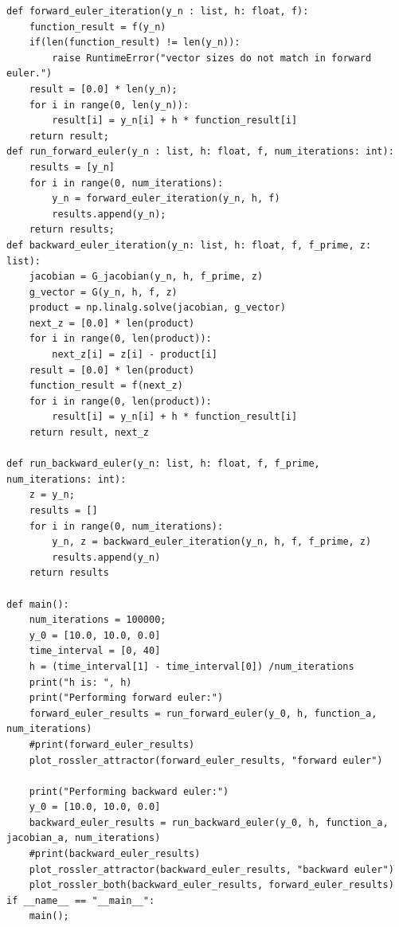 \documentclass{article}
\begin{document}
\begin{lstlisting}
def forward_euler_iteration(y_n : list, h: float, f):
    function_result = f(y_n)
    if(len(function_result) != len(y_n)):
        raise RuntimeError("vector sizes do not match in forward euler.")
    result = [0.0] * len(y_n);
    for i in range(0, len(y_n)):
        result[i] = y_n[i] + h * function_result[i]
    return result;
def run_forward_euler(y_n : list, h: float, f, num_iterations: int):
    results = [y_n]
    for i in range(0, num_iterations):
        y_n = forward_euler_iteration(y_n, h, f)
        results.append(y_n);
    return results;
def backward_euler_iteration(y_n: list, h: float, f, f_prime, z: list):
    jacobian = G_jacobian(y_n, h, f_prime, z)
    g_vector = G(y_n, h, f, z)
    product = np.linalg.solve(jacobian, g_vector)
    next_z = [0.0] * len(product)
    for i in range(0, len(product)):
        next_z[i] = z[i] - product[i]
    result = [0.0] * len(product)
    function_result = f(next_z)
    for i in range(0, len(product)):
        result[i] = y_n[i] + h * function_result[i]
    return result, next_z

def run_backward_euler(y_n: list, h: float, f, f_prime, num_iterations: int):
    z = y_n;
    results = []
    for i in range(0, num_iterations):
        y_n, z = backward_euler_iteration(y_n, h, f, f_prime, z)
        results.append(y_n)
    return results

def main():
    num_iterations = 100000;
    y_0 = [10.0, 10.0, 0.0]
    time_interval = [0, 40]
    h = (time_interval[1] - time_interval[0]) /num_iterations
    print("h is: ", h)
    print("Performing forward euler:")
    forward_euler_results = run_forward_euler(y_0, h, function_a, num_iterations)
    #print(forward_euler_results)
    plot_rossler_attractor(forward_euler_results, "forward euler")
    
    print("Performing backward euler:")
    y_0 = [10.0, 10.0, 0.0]
    backward_euler_results = run_backward_euler(y_0, h, function_a, jacobian_a, num_iterations)
    #print(backward_euler_results)
    plot_rossler_attractor(backward_euler_results, "backward euler")
    plot_rossler_both(backward_euler_results, forward_euler_results)
if __name__ == "__main__":
    main();
\end{lstlisting}
\end{document}

